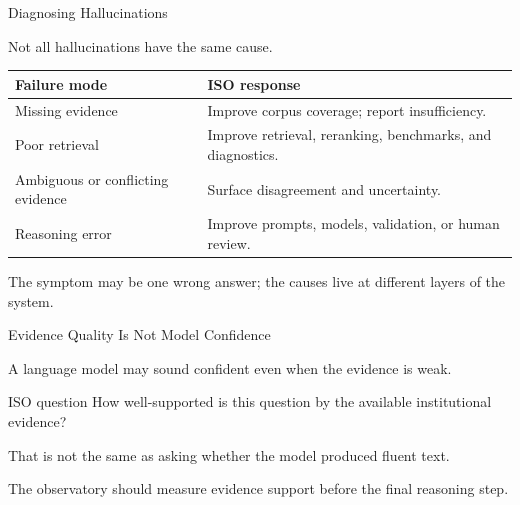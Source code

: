\documentclass[aspectratio=169]{beamer}
\begin{document}
\begin{frame}{Diagnosing Hallucinations}

\small

Not all hallucinations have the same cause.

\vspace{0.3cm}

\begin{table}
\begin{tabular}{p{}p{}}
\toprule
\textbf{Failure mode} & \textbf{ISO response} \\
\midrule
Missing evidence & Improve corpus coverage; report insufficiency. \\
Poor retrieval & Improve retrieval, reranking, benchmarks, and diagnostics. \\
Ambiguous or conflicting evidence & Surface disagreement and uncertainty. \\
Reasoning error & Improve prompts, models, validation, or human review. \\
\bottomrule
\end{tabular}
\end{table}

\vspace{0.35cm}

The symptom may be one wrong answer; the causes live at different layers of the system.

\end{frame}

\begin{frame}{Evidence Quality Is Not Model Confidence}

\Large

A language model may sound confident even when the evidence is weak.

\vspace{0.55cm}

\begin{block}{ISO question}
How well-supported is this question by the available institutional evidence?
\end{block}

\vspace{0.55cm}

That is not the same as asking whether the model produced fluent text.

\vspace{0.4cm}

The observatory should measure evidence support before the final reasoning step.

\end{frame}
\end{document}
